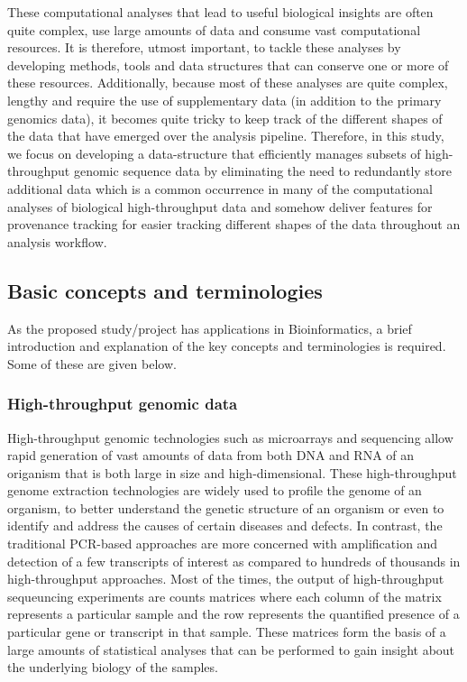 \documentclass[
]{article}
\begin{document}
These computational analyses that lead to useful biological insights are
often quite complex, use large amounts of data and consume vast
computational resources. It is therefore, utmost important, to tackle
these analyses by developing methods, tools and data structures that can
conserve one or more of these resources. Additionally, because most of
these analyses are quite complex, lengthy and require the use of
supplementary data (in addition to the primary genomics data), it
becomes quite tricky to keep track of the different shapes of the data
that have emerged over the analysis pipeline. Therefore, in this study,
we focus on developing a data-structure that efficiently manages subsets
of high-throughput genomic sequence data by eliminating the need to
redundantly store additional data which is a common occurrence in many
of the computational analyses of biological high-throughput data and
somehow deliver features for provenance tracking for easier tracking
different shapes of the data throughout an analysis workflow.

\hypertarget{basic-concepts-and-terminologies}{%
\subsection{Basic concepts and
terminologies}\label{basic-concepts-and-terminologies}}

As the proposed study/project has applications in Bioinformatics, a
brief introduction and explanation of the key concepts and terminologies
is required. Some of these are given below.

\hypertarget{high-throughput-genomic-data}{%
\subsubsection{High-throughput genomic
data}\label{high-throughput-genomic-data}}

High-throughput genomic technologies such as microarrays and sequencing
allow rapid generation of vast amounts of data from both DNA and RNA of
an origanism that is both large in size and high-dimensional. These
high-throughput genome extraction technologies are widely used to
profile the genome of an organism, to better understand the genetic
structure of an organism or even to identify and address the causes of
certain diseases and defects. In contrast, the traditional PCR-based
approaches are more concerned with amplification and detection of a few
transcripts of interest as compared to hundreds of thousands in
high-throughput approaches. Most of the times, the output of
high-throughput sequeuncing experiments are counts matrices where each
column of the matrix represents a particular sample and the row
represents the quantified presence of a particular gene or transcript in
that sample. These matrices form the basis of a large amounts of
statistical analyses that can be performed to gain insight about the
underlying biology of the samples.
\end{document}
